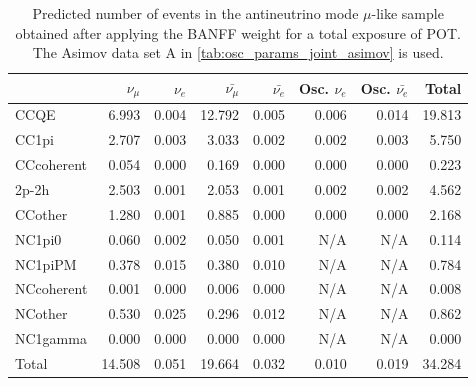 
\begin{table}
\center
\begin{tabular} { | l ||r | r | r | r | r | r | | r | }
\hline
              & $\nu_\mu$            & $\nu_e$              & $\bar{\nu_\mu}$      & $\bar{\nu_e}$        & Osc. $\nu_e$         & Osc. $\bar{\nu_e}$   & Total                \\ \hline\hline
 CCQE         & 6.993                & 0.004                & 12.792               & 0.005                & 0.006                & 0.014                & 19.813               \\ \hline
 CC1pi        & 2.707                & 0.003                & 3.033                & 0.002                & 0.002                & 0.003                & 5.750                \\ \hline
 CCcoherent   & 0.054                & 0.000                & 0.169                & 0.000                & 0.000                & 0.000                & 0.223                \\ \hline
 2p-2h          & 2.503                & 0.001                & 2.053                & 0.001                & 0.002                & 0.002                & 4.562                \\ \hline
 CCother      & 1.280                & 0.001                & 0.885                & 0.000                & 0.000                & 0.000                & 2.168                \\ \hline
 NC1pi0       & 0.060                & 0.002                & 0.050                & 0.001                & N/A                  & N/A                  & 0.114                \\ \hline
 NC1piPM      & 0.378                & 0.015                & 0.380                & 0.010                & N/A                  & N/A                  & 0.784                \\ \hline
 NCcoherent   & 0.001                & 0.000                & 0.006                & 0.000                & N/A                  & N/A                  & 0.008                \\ \hline
 NCother      & 0.530                & 0.025                & 0.296                & 0.012                & N/A                  & N/A                  & 0.862                \\ \hline
 NC1gamma     & 0.000                & 0.000                & 0.000                & 0.000                & N/A                  & N/A                  & 0.000                \\ \hline
\hline
 Total        & 14.508               & 0.051                & 19.664               & 0.032                & 0.010                & 0.019                & 34.284               \\ \hline

\end{tabular}
\caption{
Predicted number of events in the antineutrino mode $\mu$-like sample
obtained after applying the BANFF weight
for a total exposure of \TotalPotNuBar{} POT.
The Asimov data set A in \cref{tab:osc_params_joint_asimov} is used.
}
\label{tab:events_rhc1rmu_Asimov_A}
\end{table}


